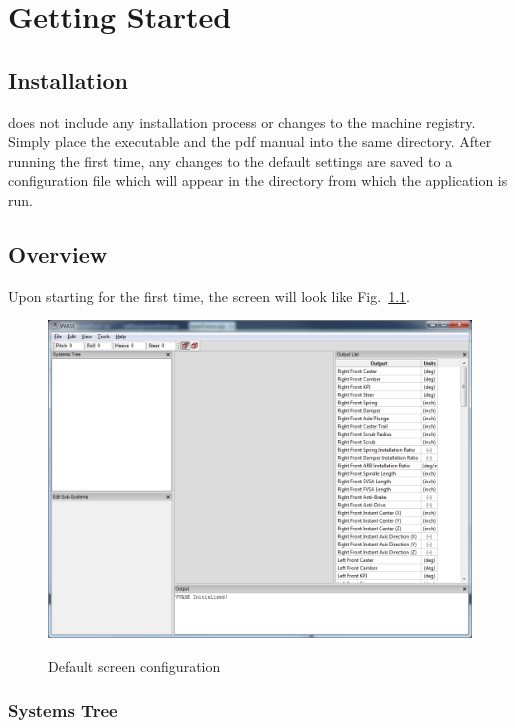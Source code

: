 \chapter{Getting Started} \label{ch:gettingStarted}

\section{Installation} \label{sec:installation}

\vvase{} does not include any installation process or changes to the machine registry.  Simply place the executable and the pdf manual into the same directory.  After running the first time, any changes to the default settings are saved to a configuration file which will appear in the directory from which the application is run.

\section{Overview} \label{sec:overview}

Upon starting \vvase{} for the first time, the screen will look like Fig.~\ref{fig:defaultStartup}.  

\begin{figure}
\includegraphics[width=\textwidth]{images/defaultStartup} \label{fig:defaultStartup}
\caption{Default screen configuration}
\centering
\end{figure}

\subsection{Systems Tree} \label{ssec:systemsTree}
